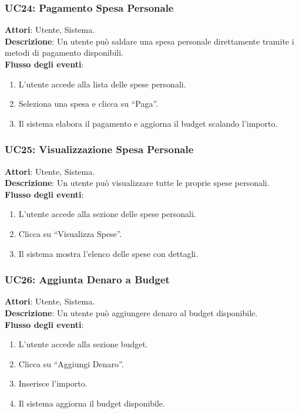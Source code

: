 \subsubsection{UC24: Pagamento Spesa Personale}
\textbf{Attori}: Utente, Sistema. \\
\textbf{Descrizione}: Un utente può saldare una spesa personale direttamente tramite i metodi di pagamento disponibili. \\
\textbf{Flusso degli eventi}:
\begin{enumerate}
    \item L’utente accede alla lista delle spese personali.
    \item Seleziona una spesa e clicca su ``Paga''.
    \item Il sistema elabora il pagamento e aggiorna il budget scalando l’importo.
\end{enumerate}

\subsubsection{UC25: Visualizzazione Spesa Personale}
\textbf{Attori}: Utente, Sistema. \\
\textbf{Descrizione}: Un utente può visualizzare tutte le proprie spese personali. \\
\textbf{Flusso degli eventi}:
\begin{enumerate}
    \item L’utente accede alla sezione delle spese personali.
    \item Clicca su ``Visualizza Spese''.
    \item Il sistema mostra l’elenco delle spese con dettagli.
\end{enumerate}

\subsubsection{UC26: Aggiunta Denaro a Budget}
\textbf{Attori}: Utente, Sistema. \\
\textbf{Descrizione}: Un utente può aggiungere denaro al budget disponibile. \\
\textbf{Flusso degli eventi}:
\begin{enumerate}
    \item L’utente accede alla sezione budget.
    \item Clicca su ``Aggiungi Denaro''.
    \item Inserisce l’importo.
    \item Il sistema aggiorna il budget disponibile.
\end{enumerate}

